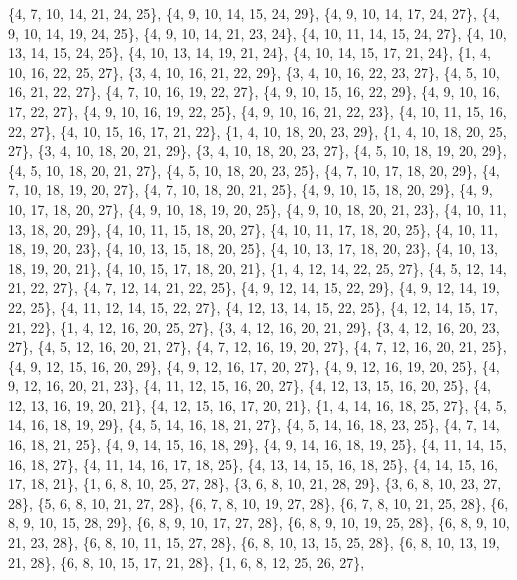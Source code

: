 \documentclass[11pt,a4paper]{article}
\begin{document}
{\{4, 7, 10, 14, 21, 24, 25\}, \{4, 9, 10, 14, 15, 24, 29\}, \{4, 9, 10, 14, 17, 24, 27\}, \{4, 9, 10, 14, 19, 24, 25\}, \{4, 9, 10, 14, 21, 23, 24\},
\{4, 10, 11, 14, 15, 24, 27\}, \{4, 10, 13, 14, 15, 24, 25\}, \{4, 10, 13, 14, 19, 21, 24\}, \{4, 10, 14, 15, 17, 21, 24\}, \{1, 4, 10, 16, 22, 25, 27\},
\{3, 4, 10, 16, 21, 22, 29\}, \{3, 4, 10, 16, 22, 23, 27\}, \{4, 5, 10, 16, 21, 22, 27\}, \{4, 7, 10, 16, 19, 22, 27\}, \{4, 9, 10, 15, 16, 22, 29\},
\{4, 9, 10, 16, 17, 22, 27\}, \{4, 9, 10, 16, 19, 22, 25\}, \{4, 9, 10, 16, 21, 22, 23\}, \{4, 10, 11, 15, 16, 22, 27\}, \{4, 10, 15, 16, 17, 21, 22\},
\{1, 4, 10, 18, 20, 23, 29\}, \{1, 4, 10, 18, 20, 25, 27\}, \{3, 4, 10, 18, 20, 21, 29\}, \{3, 4, 10, 18, 20, 23, 27\}, \{4, 5, 10, 18, 19, 20, 29\},
\{4, 5, 10, 18, 20, 21, 27\}, \{4, 5, 10, 18, 20, 23, 25\}, \{4, 7, 10, 17, 18, 20, 29\}, \{4, 7, 10, 18, 19, 20, 27\}, \{4, 7, 10, 18, 20, 21, 25\},
\{4, 9, 10, 15, 18, 20, 29\}, \{4, 9, 10, 17, 18, 20, 27\}, \{4, 9, 10, 18, 19, 20, 25\}, \{4, 9, 10, 18, 20, 21, 23\}, \{4, 10, 11, 13, 18, 20, 29\},
\{4, 10, 11, 15, 18, 20, 27\}, \{4, 10, 11, 17, 18, 20, 25\}, \{4, 10, 11, 18, 19, 20, 23\}, \{4, 10, 13, 15, 18, 20, 25\}, \{4, 10, 13, 17, 18, 20, 23\},
\{4, 10, 13, 18, 19, 20, 21\}, \{4, 10, 15, 17, 18, 20, 21\}, \{1, 4, 12, 14, 22, 25, 27\}, \{4, 5, 12, 14, 21, 22, 27\}, \{4, 7, 12, 14, 21, 22, 25\},
\{4, 9, 12, 14, 15, 22, 29\}, \{4, 9, 12, 14, 19, 22, 25\}, \{4, 11, 12, 14, 15, 22, 27\}, \{4, 12, 13, 14, 15, 22, 25\}, \{4, 12, 14, 15, 17, 21, 22\},
\{1, 4, 12, 16, 20, 25, 27\}, \{3, 4, 12, 16, 20, 21, 29\}, \{3, 4, 12, 16, 20, 23, 27\}, \{4, 5, 12, 16, 20, 21, 27\}, \{4, 7, 12, 16, 19, 20, 27\},
\{4, 7, 12, 16, 20, 21, 25\}, \{4, 9, 12, 15, 16, 20, 29\}, \{4, 9, 12, 16, 17, 20, 27\}, \{4, 9, 12, 16, 19, 20, 25\}, \{4, 9, 12, 16, 20, 21, 23\},
\{4, 11, 12, 15, 16, 20, 27\}, \{4, 12, 13, 15, 16, 20, 25\}, \{4, 12, 13, 16, 19, 20, 21\}, \{4, 12, 15, 16, 17, 20, 21\}, \{1, 4, 14, 16, 18, 25, 27\},
\{4, 5, 14, 16, 18, 19, 29\}, \{4, 5, 14, 16, 18, 21, 27\}, \{4, 5, 14, 16, 18, 23, 25\}, \{4, 7, 14, 16, 18, 21, 25\}, \{4, 9, 14, 15, 16, 18, 29\},
\{4, 9, 14, 16, 18, 19, 25\}, \{4, 11, 14, 15, 16, 18, 27\}, \{4, 11, 14, 16, 17, 18, 25\}, \{4, 13, 14, 15, 16, 18, 25\}, \{4, 14, 15, 16, 17, 18, 21\},
\{1, 6, 8, 10, 25, 27, 28\}, \{3, 6, 8, 10, 21, 28, 29\}, \{3, 6, 8, 10, 23, 27, 28\}, \{5, 6, 8, 10, 21, 27, 28\}, \{6, 7, 8, 10, 19, 27, 28\},
\{6, 7, 8, 10, 21, 25, 28\}, \{6, 8, 9, 10, 15, 28, 29\}, \{6, 8, 9, 10, 17, 27, 28\}, \{6, 8, 9, 10, 19, 25, 28\}, \{6, 8, 9, 10, 21, 23, 28\},
\{6, 8, 10, 11, 15, 27, 28\}, \{6, 8, 10, 13, 15, 25, 28\}, \{6, 8, 10, 13, 19, 21, 28\}, \{6, 8, 10, 15, 17, 21, 28\}, \{1, 6, 8, 12, 25, 26, 27\},
}
\end{document}

